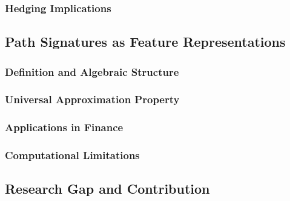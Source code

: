 

\subsubsection{Hedging Implications}




\subsection{Path Signatures as Feature Representations}
\label{subsec:path_signatures}

\subsubsection{Definition and Algebraic Structure}



\subsubsection{Universal Approximation Property}



\subsubsection{Applications in Finance}



\subsubsection{Computational Limitations}




\subsection{Research Gap and Contribution}
\label{subsec:research_gap}

